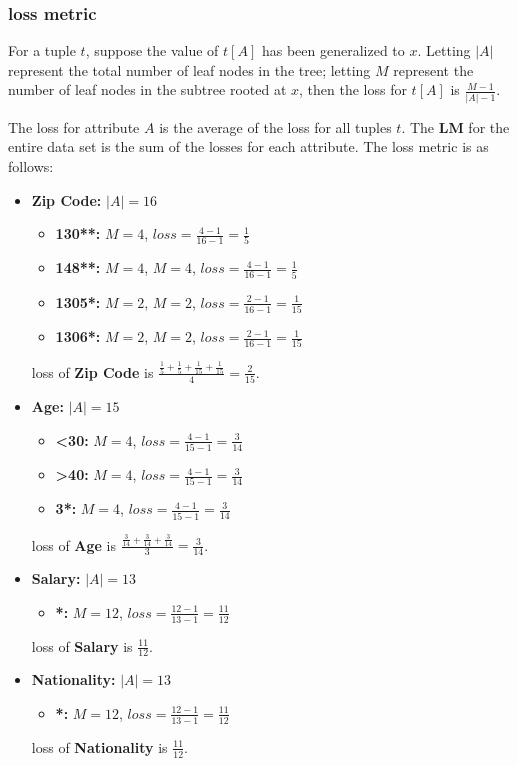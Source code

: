 \documentclass[a4paper,12pt]{article}
\begin{document}
\subsubsection{loss metric}
For a tuple $t$, suppose the value of $t[A]$ has been generalized to $x$.
Letting $|A|$ represent the total number of leaf nodes in the tree;
letting $M$ represent the number of leaf nodes in the subtree rooted at $x$,
then the loss for $t[A]$ is $\frac{M - 1}{|A| - 1}$.

The loss for attribute $A$ is the average of the loss for all tuples $t$. The
\textbf{LM} for the entire data set is the sum of the losses for each attribute.
The loss metric is as follows:

\begin{itemize}
    \item \textbf{Zip Code:} $|A| = 16$
          \begin{itemize}
              \item \textbf{130**:} $M = 4$, $loss = \frac{4 - 1}{16 - 1} = \frac{1}{5}$
              \item \textbf{148**:} $M = 4$, $M = 4$, $loss = \frac{4 - 1}{16 - 1} = \frac{1}{5}$
              \item \textbf{1305*:} $M = 2$, $M = 2$, $loss = \frac{2 - 1}{16 - 1} = \frac{1}{15}$
              \item \textbf{1306*:} $M = 2$, $M = 2$, $loss = \frac{2 - 1}{16 - 1} = \frac{1}{15}$
          \end{itemize}
          loss of \textbf{Zip Code} is $\frac{\frac{1}{5} + \frac{1}{5} + \frac{1}{15} + \frac{1}{15}}{4} = \frac{2}{15}$.
    \item \textbf{Age:} $|A| = 15$
          \begin{itemize}
              \item \textbf{<30:} $M = 4$, $loss = \frac{4 - 1}{15 - 1} = \frac{3}{14}$
              \item \textbf{>40:} $M = 4$, $loss = \frac{4 - 1}{15 - 1} = \frac{3}{14}$
              \item \textbf{3*:} $M = 4$, $loss = \frac{4 - 1}{15 - 1} = \frac{3}{14}$
          \end{itemize}
          loss of \textbf{Age} is $\frac{\frac{3}{14} + \frac{3}{14} + \frac{3}{14}}{3} = \frac{3}{14}$.
    \item \textbf{Salary:} $|A| = 13$
          \begin{itemize}
              \item \textbf{*:} $M = 12$, $loss = \frac{12 - 1}{13 - 1} = \frac{11}{12}$
          \end{itemize}
          loss of \textbf{Salary} is $\frac{11}{12}$.
    \item \textbf{Nationality:} $|A| = 13$
          \begin{itemize}
              \item \textbf{*:} $M = 12$, $loss = \frac{12 - 1}{13 - 1} = \frac{11}{12}$
          \end{itemize}
          loss of \textbf{Nationality} is $\frac{11}{12}$.
\end{itemize}
\end{document}
